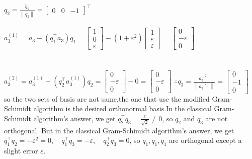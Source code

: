 \documentclass[english,onecolumn]{IEEEtran}
\begin{document}
\begin{enumerate}
\\$q_{2}=\frac{\tilde{q}_{2}}{\left\|\hat{q}_{2}\right\|}=\left[\begin{array}{lll}0 & 0 & -1\end{array}\right]^{\top}$
\\\\$a_{3}^{(1)}=a_{3}-\left(q_{1}^{\top} a_{3}\right) q_{1}=\left[\begin{array}{l}1 \\ 0 \\ \varepsilon\end{array}\right]-\left(1+\varepsilon^{2}\right)\left[\begin{array}{l}1 \\ \varepsilon \\ \varepsilon\end{array}\right]=\left[\begin{array}{c}0 \\ -\varepsilon \\ 0\end{array}\right]$\\
\\\\$a_{3}^{(2)}=a_{3}^{(1)}-\left(q_{2}^{\top} a_{3}^{(1)}\right) q_{2}=\left[\begin{array}{c}0 \\ -\varepsilon \\ 0\end{array}\right]-0=\left[\begin{array}{c}0 \\ -\varepsilon \\ 0\end{array}\right]$
$\therefore q_{3}=\frac{a_{3}^{(2)}}{\left\|a_{3}^{(2)}\right\|}=\left[\begin{array}{c}0 \\ -1 \\ 0\end{array}\right]$\\
so the two sets of basis are not same,the one that use the modified Gram-Schimidt algorithm is the desired orthonormal basis.In the classical Gram-Schimidt algorithm's answer, we get $q_{2}^{\top} q_{3}=\frac{1}{\sqrt{2}} \neq 0$, so $q_{2}$ and $q_{3}$ are not orthogonal. But in the classical Gram-Schimidt algorithm's answer, we get $q_{1}^{\top} q_{2}=-\varepsilon^{2}=0 ,\quad q_{1}^{\top} q_{3}=-\varepsilon ,\quad q_{2}^{\top} q_{3}=0$, so $q_{1}, q_{1}, q_{1}$ are orthogonal except a slight error $\varepsilon$.


\end{enumerate}
\end{document}
